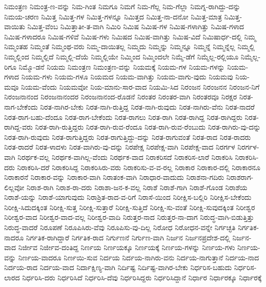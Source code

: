 {ನಿಮಂತ್ರಣ
ನಿಮಂತ್ರ-ಣ-ವನ್ನು
ನಿಮ-ಗಿಂತ
ನಿಮಗೂ
ನಿಮಗೆ
ನಿಮ-ಗೆಲ್ಲ
ನಿಮ-ಗೆಲ್ಲಾ
ನಿಮಗ್ನ-ರಾಗಿದ್ದು-ದನ್ನು
ನಿಮಯ-ಚರಣ
ನಿಮಿತ್ತ
ನಿಮಿತ್ತ-ಗಳ
ನಿಮಿತ್ತ-ಗಳನ್ನೂ
ನಿಮಿತ್ತದ
ನಿಮಿತ್ತ-ನಾ-ದನೋ
ನಿಮಿತ್ತ-ಮಾತ್ರ
ನಿಮಿತ್ತ-ವಾಯಿತು
ನಿಮಿತ್ತ-ವೆಂಬ
ನಿಮಿತ್ತಾತೀ-ತ-ವಾಗಿ
ನಿಮಿರಿ
ನಿಮಿಷ
ನಿಮಿಷ-ಗಳ
ನಿಮಿಷ-ಗಳಾಗಿತ್ತು
ನಿಮಿಷ-ಗಳಾದ
ನಿಮಿಷ-ಗಳಾದರೂ
ನಿಮಿಷ-ಗಳಿವೆ
ನಿಮಿಷ-ಗಳು
ನಿಮಿಷದ
ನಿಮಿಷ-ವಾಗಿತ್ತು
ನಿಮಿಷ-ವಿದೆ
ನಿಮಿಷಾರ್ಧ-ದಲ್ಲಿ
ನಿಮ್ಮ
ನಿಮ್ಮಂತಹ
ನಿಮ್ಮಂತೆ
ನಿಮ್ಮಂಥ-ವರು
ನಿಮ್ಮ-ದಾಯಿತಲ್ಲ
ನಿಮ್ಮದು
ನಿಮ್ಮನ್ನು
ನಿಮ್ಮನ್ನೂ
ನಿಮ್ಮನ್ನೆ
ನಿಮ್ಮನ್ನೆಲ್ಲ
ನಿಮ್ಮಲ್ಲಿ
ನಿಮ್ಮಲ್ಲಿಂದ
ನಿಮ್ಮಲ್ಲಿದೆ
ನಿಮ್ಮಲ್ಲಿ-ದೆಯೆ
ನಿಮ್ಮಲ್ಲಿಯೇ
ನಿಮ್ಮಿಂದ
ನಿಮ್ಮಿಂದಲೇ
ನಿಮ್ಮೆ-ಡೆಗೆ
ನಿಮ್ಮೆಲ್ಲ-ರಲ್ಲಿಯೂ
ನಿಮ್ಮೆಲ್ಲ-ರಿಗೂ
ನಿಮ್ಮೊ-ಡನೆ
ನಿಯಮ
ನಿಮಂತ್ರಣ
ನಿಮಂತ್ರಣ-ವನ್ನು
ನಿಯಮಕ್ಕೆ
ನಿಯಮ-ಗಳ
ನಿಯಮ-ಗಳನ್ನು
ನಿಯಮ-ಗಳಾದ
ನಿಯಮ-ಗಳು
ನಿಯಮ-ಗಳೂ
ನಿಯಮದ
ನಿಯಮ-ವಾಗಿತ್ತು
ನಿಯಮ-ವಾಗು-ವುದು
ನಿಯಮವು
ನಿಯ-ಮವೂ
ನಿಯಮ-ವೆಂದು
ನಿಯಮವೋ
ನಿಯ-ಮಾನು-ಸಾರ-ವಾದ
ನಿಯಮಿ-ಸಿದ
ನಿರಂಜನ
ನಿರಂಜನನ
ನಿರಂಜನ-ನಿಗೆ
ನಿರಂಜನಾನಂದ
ನಿರಂಜನಾನಂದರ
ನಿರಂಜನಾನಂದ-ರೊಡನೆ
ನಿರಂತರ
ನಿರಂತರ-ವಾಗಿ
ನಿರಂತರವೂ
ನಿರಕ್ಷರ
ನಿರತ-ನಾಗ-ಬೇಕೆಂದು
ನಿರತ-ನಾಗಿರ-ಬೇಕು
ನಿರತ-ನಾಗಿ-ರುತ್ತಿದ್ದ
ನಿರತ-ನಾಗಿ-ರುವುದು
ನಿರತ-ನಾಗಿರು-ವೆನು
ನಿರತ-ನಾದರೆ
ನಿರತ-ರಾಗ-ಬಹು-ದೆಂದೂ
ನಿರತ-ರಾಗ-ಬೇಕೆಂದು
ನಿರತ-ರಾಗಲು
ನಿರತ-ರಾಗಿ
ನಿರತ-ರಾಗಿದ್ದ
ನಿರತ-ರಾಗಿದ್ದರು
ನಿರತ-ರಾಗಿದ್ದ-ವರು
ನಿರತ-ರಾಗಿ-ರುತ್ತಿದ್ದರು
ನಿರತ-ರಾಗಿ-ರುವ-ರೆಂದೂ
ನಿರತ-ರಾಗಿ-ರುವ-ರೆಂಬುದು
ನಿರತ-ರಾಗಿರು-ವು-ದನ್ನು
ನಿರತ-ರಾಗಿ-ರುವುದು
ನಿರತ-ರಾಗುತ್ತಿದ್ದರು
ನಿರತ-ರಾಗುತ್ತಿದ್ದು-ದನ್ನು
ನಿರತ-ರಾಗುವಂತೆ
ನಿರತ-ರಾದ
ನಿರತ-ರಾದರು
ನಿರತ-ರಾದರೆ
ನಿರತ-ಳಾದಳು
ನಿರತ-ವಾಗಿರು-ವು-ದನ್ನು
ನಿರಪೇಕ್ಷ
ನಿರಪೇಕ್ಷ-ವಾಗಿ
ನಿರಪೇಕ್ಷ-ವಾದ
ನಿರರ್ಗಳ
ನಿರರ್ಗಳ-ವಾಗಿ
ನಿರರ್ಥಕ-ವಲ್ಲ
ನಿರರ್ಥಕ-ವಾಗಿಲ್ಲ-ವೆಂದು
ನಿರರ್ಥಕ-ವಾದ
ನಿರಾಕರಿಸದೆ
ನಿರಾಕರಿಸ-ಲಾರೆ
ನಿರಾಕರಿಸಿ
ನಿರಾಕರಿಸಿ-ದರು
ನಿರಾಕರಿಸಿ-ದರೆ
ನಿರಾಕರಿಸಿದ್ದ
ನಿರಾಕರಿಸಿರು-ವರು
ನಿರಾಕರಿಸು-ವ-ವ-ರಲ್ಲ
ನಿರಾಕಾರ
ನಿರಾಕಾರ-ದಲ್ಲಿ
ನಿರಾಕಾರನೂ
ನಿರಾಕಾರನೆ
ನಿರಾಕಾರ-ವನ್ನು
ನಿರಾಕಾರ-ವಾಗಿ
ನಿರಾತಂಕ-ವಾಗಿ
ನಿರಾಧಾರ-ವಾದುದು
ನಿರಾಶನಾ-ಗದಿರು
ನಿರಾಶರಾಗ-ಲಿಲ್ಲವೋ
ನಿರಾಶ-ರಾಗಿ
ನಿರಾಶ-ರಾ-ದರು
ನಿರಾಶಾ-ಜನ-ಕ-ವಲ್ಲ
ನಿರಾಶೆ
ನಿರಾಶೆ-ಗಾಗಿ
ನಿರಾಶೆ-ಗೊಂಡ
ನಿರಾಶೆಯ
ನಿರಾಶೆ-ಯನ್ನು
ನಿರಾಶೆ-ಯಾಗುವುದು
ನಿರಾಶ್ರಿತ-ರಾದ-ವ-ರಿಗೆ
ನಿರಾಸೆ-ಯಿಂದ
ನಿರೀಕ್ಷಿಸ-ಬಲ್ಲಿರಿ
ನಿರೀಕ್ಷಿಸ-ಬೇಕೆಂದು
ನಿರೀಕ್ಷಿ-ಸಿದುದಕ್ಕಿಂತ
ನಿರೀಕ್ಷಿ-ಸುತ್ತ
ನಿರೀಕ್ಷಿ-ಸುತ್ತಾರೆ
ನಿರೀಕ್ಷಿ-ಸುತ್ತಿದೆ
ನಿರೀಕ್ಷಿ-ಸು-ವಂತೆ
ನಿರೀಕ್ಷಿ-ಸುವುದಕ್ಕಿಂತ
ನಿರೀಶ್ವರ
ನಿರೀಶ್ವರ-ವಾದ
ನಿರೀಶ್ವರ-ವಾದ-ವಲ್ಲ
ನಿರೀಶ್ವರ-ವಾದಿ
ನಿರುತ್ತರ-ನಾದ
ನಿರುತ್ತರ-ನಾ-ದಾಗ
ನಿರುದ್ಧ-ವಾಗಿ-ಬಿಡುತ್ತಿತ್ತು
ನಿರುದ್ಧ-ವಾದರೆ
ನಿರೂಪಣೆ
ನಿರೂಪಿಸಿರು-ವೆವು
ನಿರೂಪಿಸು-ವು-ದಿಲ್ಲ
ನಿರೋಧ
ನಿರೋಧನ-ವನ್ನೇ
ನಿರ್ಗಚ್ಛತಿ
ನಿರ್ಗತಿಕ-ನಾದರೂ
ನಿರ್ಗತಿಕ-ರಾಗಿದ್ದಾರೆ
ನಿರ್ಗತಿಕ-ರಾದ
ನಿರ್ಗುಣನೆ
ನಿರ್ಗುಣ-ವಾಗಿ
ನಿರ್ಜನ
ನಿರ್ಜನಪ್ರದೇಶ-ದಲ್ಲಿ
ನಿರ್ಜನ-ವಾದ
ನಿರ್ಜೀವ
ನಿರ್ಜೀವ-ದಂತಿದ್ದ
ನಿರ್ಣಯ
ನಿರ್ಣಯಕ್ಕೂ
ನಿರ್ಣಯಕ್ಕೆ
ನಿರ್ಣಯ-ಗಳನ್ನು
ನಿರ್ಣಯ-ಗಳು
ನಿರ್ಣಯ-ವನ್ನು
ನಿರ್ಣಯ-ವಾದರೂ
ನಿರ್ಣಯಿ-ಸುವ
ನಿರ್ದಯ
ನಿರ್ದಯ-ನಾಗಿರು-ವನು
ನಿರ್ದಯ-ನಾಗುತ್ತಾನೆ
ನಿರ್ದಯ-ನಾದ
ನಿರ್ದಯ-ರಾದ
ನಿರ್ದಯ-ವಾದ
ನಿರ್ದಾಕ್ಷಿಣ್ಯ-ವಾಗಿ
ನಿರ್ದಿಷ್ಟ
ನಿರ್ದಿಷ್ಟ-ವಾಗಿರ-ಬೇಕು
ನಿರ್ಧರಿಸ-ಬಹುದು
ನಿರ್ಧರಿಸ-ಲಾರದ
ನಿರ್ಧರಿಸಿ-ದರು
ನಿರ್ಧರಿಸಿದೆ
ನಿರ್ಧರಿಸಿ-ದೆವು
ನಿರ್ಧರಿಸಿದ್ದರು
ನಿರ್ಧರಿಸಿದ್ದಾನೆ
ನಿರ್ಧಾರ
ನಿರ್ಧಾರಕ್ಕೂ
ನಿರ್ಧಾರಕ್ಕೆ
}
